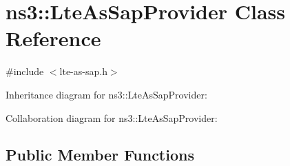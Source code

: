\hypertarget{classns3_1_1LteAsSapProvider}{}\section{ns3\+:\+:Lte\+As\+Sap\+Provider Class Reference}
\label{classns3_1_1LteAsSapProvider}


{\ttfamily \#include $<$lte-\/as-\/sap.\+h$>$}



Inheritance diagram for ns3\+:\+:Lte\+As\+Sap\+Provider\+:


Collaboration diagram for ns3\+:\+:Lte\+As\+Sap\+Provider\+:
\subsection*{Public Member Functions}
